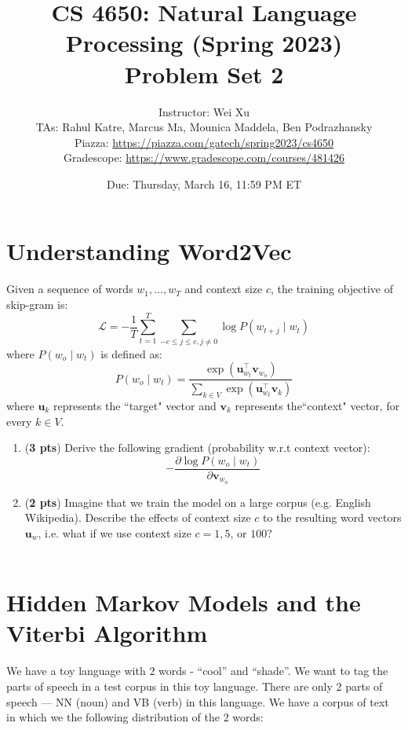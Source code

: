 \documentclass[11pt, letterpaper]{article}
\begin{document}
\title{CS 4650: Natural Language Processing (Spring 2023) \\ Problem Set 2}
\author{Instructor: Wei Xu \\ TAs: Rahul Katre, Marcus Ma, Mounica Maddela, Ben Podrazhansky
\\Piazza: \url{https://piazza.com/gatech/spring2023/cs4650}
\\Gradescope: \url{https://www.gradescope.com/courses/481426}}
\date{Due: Thursday, March 16, 11:59 PM ET}
\maketitle

\section{Understanding Word2Vec}
Given a sequence of words $w_{1}, \ldots, w_{T}$ and context size $c$, the training objective of skip-gram is:
$$
\mathcal{L}=-\frac{1}{T} \sum_{t=1}^{T} \sum_{-c \leq j \leq c, j \neq 0} \log P\left(w_{t+j} \mid w_{t}\right)
$$
where $P\left(w_{o} \mid w_{t}\right)$ is defined as:
$$
P\left(w_{o} \mid w_{t}\right)=\frac{\exp \left(\mathbf{u}_{w_{t}}^{\top} \mathbf{v}_{w_{o}}\right)}{\sum_{k \in V} \exp \left(\mathbf{u}_{w_{t}}^{\top} \mathbf{v}_{k}\right)}
$$
where $\mathbf{u}_{k}$ represents the ``target" vector and $\mathbf{v}_{k}$ represents the``context" vector, for every $k \in V$.\\
\begin{enumerate}[label=(\alph*)]
\item (\textbf{3 pts}) Derive the following gradient (probability w.r.t context vector):
$$
-\frac{\partial \log P\left(w_{o} \mid w_{t}\right)}{\partial \mathbf{v}_{w_{o}}}
$$

\item (\textbf{2 pts}) Imagine that we train the model on a large corpus (e.g. English Wikipedia). Describe the effects of context size $c$ to the resulting word vectors $\mathbf{u}_{w}$, i.e. what if we use context size $c=1,5$, or $100 ?$\\\\

\end{enumerate}

\newpage

\section{Hidden Markov Models and the Viterbi Algorithm}
    We have a toy language with 2 words - “cool” and “shade”. We want to tag the parts of speech in a test corpus in this toy language. There are only 2 parts of speech — NN (noun) and VB (verb) in this language. We have a corpus of text in which we the following distribution of the 2 words:
    
\end{document}
